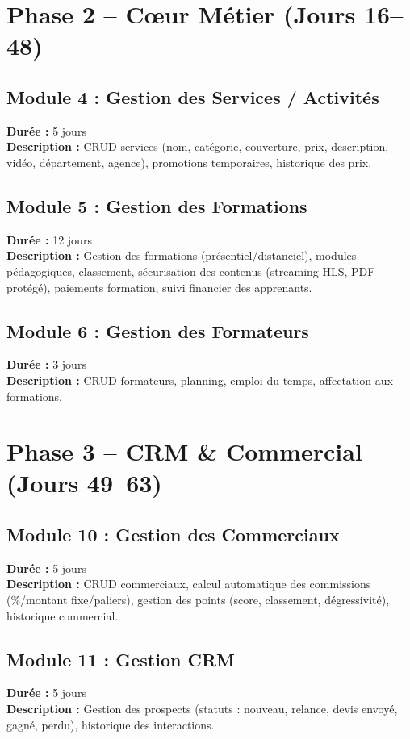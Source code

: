 \documentclass[12pt,a4paper]{report}
\begin{document}
\section{Phase 2 -- Cœur Métier (Jours 16--48)}
\label{sec:phase2}

\subsection*{Module 4 : Gestion des Services / Activités}
\textbf{Durée :} 5 jours \\
\textbf{Description :} CRUD services (nom, catégorie, couverture, prix, description, vidéo, département, agence), promotions temporaires, historique des prix.

\subsection*{Module 5 : Gestion des Formations}
\textbf{Durée :} 12 jours \\
\textbf{Description :} Gestion des formations (présentiel/distanciel), modules pédagogiques, classement, sécurisation des contenus (streaming HLS, PDF protégé), paiements formation, suivi financier des apprenants.

\subsection*{Module 6 : Gestion des Formateurs}
\textbf{Durée :} 3 jours \\
\textbf{Description :} CRUD formateurs, planning, emploi du temps, affectation aux formations.

\section{Phase 3 -- CRM \& Commercial (Jours 49--63)}
\label{sec:phase3}

\subsection*{Module 10 : Gestion des Commerciaux}
\textbf{Durée :} 5 jours \\
\textbf{Description :} CRUD commerciaux, calcul automatique des commissions (\%/montant fixe/paliers), gestion des points (score, classement, dégressivité), historique commercial.

\subsection*{Module 11 : Gestion CRM}
\textbf{Durée :} 5 jours \\
\textbf{Description :} Gestion des prospects (statuts : nouveau, relance, devis envoyé, gagné, perdu), historique des interactions.
\end{document}
